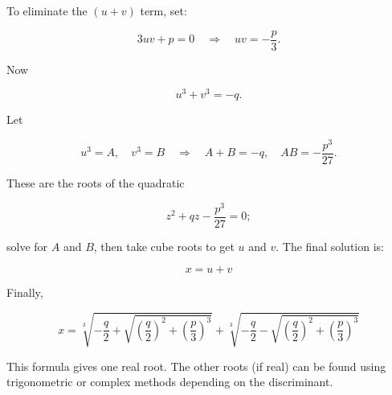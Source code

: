 To eliminate the \((u+v)\) term, set:

\[
    3uv + p = 0 \quad \Rightarrow \quad uv = -\frac{p}{3}.
\]

Now

\[
    u^3 + v^3 = -q.
\]

Let

\[
    u^3 = A, \quad v^3 = B \quad \Rightarrow \quad A + B = -q, \quad AB = -\frac{p^3}{27}.
\]

These are the roots of the quadratic

\[
    z^2 + qz - \frac{p^3}{27} = 0;
\]

solve for \(A\) and \(B\), then take cube roots to get \(u\) and \(v\). The final solution is:

\[
    x = u + v
\]

Finally, 

\[
    x = \sqrt[3]{-\frac{q}{2} + \sqrt{{\left(\frac{q}{2}\right)}^2 + {\left(\frac{p}{3}\right)}^3}} + 
    \sqrt[3]{-\frac{q}{2} - \sqrt{{\left(\frac{q}{2}\right)}^2 + {\left(\frac{p}{3}\right)}^3}}
\]

This formula gives one real root. The other roots (if real) can be found using trigonometric or complex 
methods depending on the discriminant.



